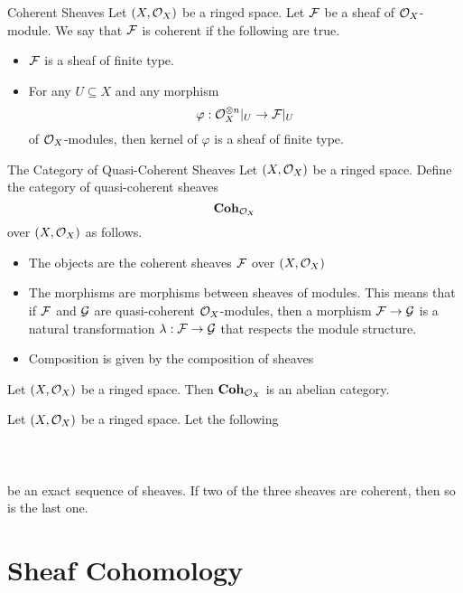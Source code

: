 \documentclass[a4paper]{article}
\begin{document}
\begin{defn}{Coherent Sheaves}{} Let $(X,\mathcal{O}_X)$ be a ringed space. Let $\mathcal{F}$ be a sheaf of $\mathcal{O}_X$-module. We say that $\mathcal{F}$ is coherent if the following are true. 
\begin{itemize}
\item $\mathcal{F}$ is a sheaf of finite type. 
\item For any $U\subseteq X$ and any morphism $$\varphi:\mathcal{O}_X^{\otimes n}|_U\to\mathcal{F}|_U$$ of $\mathcal{O}_X$-modules, then kernel of $\varphi$ is a sheaf of finite type. 
\end{itemize}
\end{defn}

\begin{defn}{The Category of Quasi-Coherent Sheaves}{} Let $(X,\mathcal{O}_X)$ be a ringed space. Define the category of quasi-coherent sheaves $$\bold{Coh}_{\mathcal{O}_X}$$ over $(X,\mathcal{O}_X)$ as follows. 
\begin{itemize}
\item The objects are the coherent sheaves $\mathcal{F}$ over $(X,\mathcal{O}_X)$
\item The morphisms are morphisms between sheaves of modules. This means that if $\mathcal{F}$ and $\mathcal{G}$ are quasi-coherent $\mathcal{O}_X$-modules, then a morphism $\mathcal{F}\to\mathcal{G}$ is a natural transformation $\lambda:\mathcal{F}\to\mathcal{G}$ that respects the module structure. 
\item Composition is given by the composition of sheaves
\end{itemize}
\end{defn}

\begin{thm}{}{} Let $(X,\mathcal{O}_X)$ be a ringed space. Then $\bold{Coh}_{\mathcal{O}_X}$ is an abelian category. 
\end{thm}

\begin{prp}{}{} Let $(X,\mathcal{O}_X)$ be a ringed space. Let the following \\~\\
\\~\\
be an exact sequence of sheaves. If two of the three sheaves are coherent, then so is the last one. 
\end{prp}

\pagebreak
\section{Sheaf Cohomology}
\end{document}
